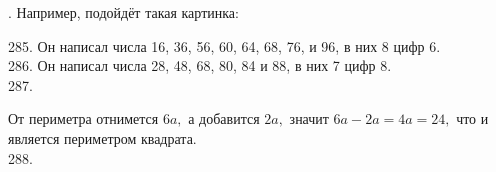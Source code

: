 \documentclass[12pt]{article}
\begin{document}
. Например, подойдёт такая картинка:
\begin{center}
\begin{figure}[ht!]
\end{figure}
\end{center}
285. Он написал числа 16, 36, 56, 60, 64, 68, 76, и 96, в них 8 цифр 6.\\
286. Он написал числа 28, 48, 68, 80, 84 и 88, в них 7 цифр 8.\\
287. \begin{center}
\begin{figure}[ht!]
\end{figure}
\end{center}
От периметра отнимется $6a,$ а добавится $2a,$ значит $6a-2a=4a=24,$ что и является периметром квадрата.\\
288. \begin{center}
\begin{figure}[ht!]
\end{figure}
\end{center}
\end{document}
